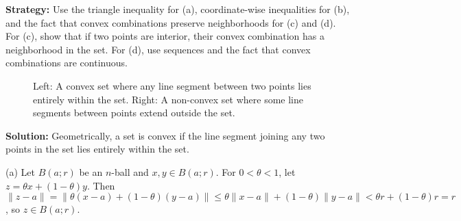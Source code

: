 \noindent\textbf{Strategy:} Use the triangle inequality for (a), coordinate-wise inequalities for (b), and the fact that convex combinations preserve neighborhoods for (c) and (d). For (c), show that if two points are interior, their convex combination has a neighborhood in the set. For (d), use sequences and the fact that convex combinations are continuous.

\begin{figure}[h]
\centering
{}
\caption{Left: A convex set where any line segment between two points lies entirely within the set. Right: A non-convex set where some line segments between points extend outside the set.}
\end{figure}

\bigskip\noindent\textbf{Solution:} Geometrically, a set is convex if the line segment joining any two points in the set lies entirely within the set.

(a) Let $B(a;r)$ be an $n$-ball and $x, y \in B(a;r)$. For $0 < \theta < 1$, let $z = \theta x + (1-\theta)y$. Then $\|z-a\| = \|\theta(x-a) + (1-\theta)(y-a)\| \leq \theta\|x-a\| + (1-\theta)\|y-a\| < \theta r + (1-\theta)r = r$, so $z \in B(a;r)$.

